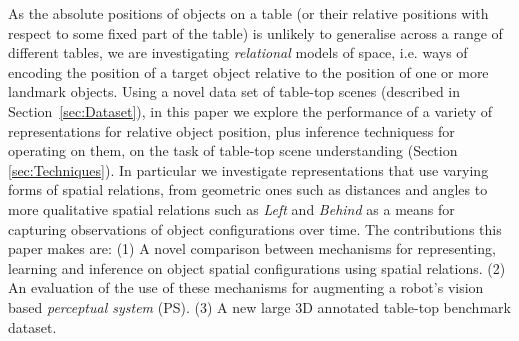 \documentclass[letterpaper, 10 pt, conference]{ieeeconf}  %
\begin{document}
As the absolute positions of objects on a table (or their relative positions with respect to some fixed part of the table) is unlikely to generalise across a range of different tables, we are investigating \emph{relational} models of space, i.e. ways of encoding the position of a target object relative to the position of one or more landmark objects. Using a novel data set of table-top scenes (described in Section~\ref{sec:Dataset}), in this paper we explore the performance of a variety of representations for relative object position, plus inference techniquess for operating on them, on the task of table-top scene understanding (Section \ref{sec:Techniques}). In particular we investigate representations that use varying forms of spatial relations, from geometric ones such as distances and angles to more qualitative spatial relations such as \textit{Left} and \textit{Behind} as a means for capturing observations of object configurations over time. The contributions this paper makes are: (1) A novel comparison between mechanisms for representing, learning and inference on object spatial configurations using spatial relations. (2) An evaluation of the use of these mechanisms for augmenting a robot's vision based \textit{perceptual system} (PS). (3) A new large 3D annotated table-top benchmark dataset.
\end{document}
